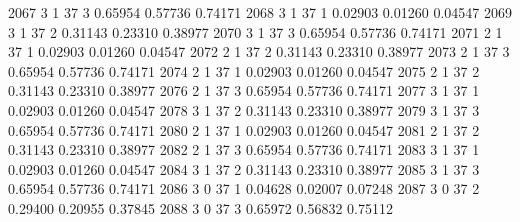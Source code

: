 \documentclass{article}
\begin{document}
\begin{Woutput}
2067      3       1      37       3       0.65954    0.57736    0.74171
2068      3       1      37       1       0.02903    0.01260    0.04547
2069      3       1      37       2       0.31143    0.23310    0.38977
2070      3       1      37       3       0.65954    0.57736    0.74171
2071      2       1      37       1       0.02903    0.01260    0.04547
2072      2       1      37       2       0.31143    0.23310    0.38977
2073      2       1      37       3       0.65954    0.57736    0.74171
2074      2       1      37       1       0.02903    0.01260    0.04547
2075      2       1      37       2       0.31143    0.23310    0.38977
2076      2       1      37       3       0.65954    0.57736    0.74171
2077      3       1      37       1       0.02903    0.01260    0.04547
2078      3       1      37       2       0.31143    0.23310    0.38977
2079      3       1      37       3       0.65954    0.57736    0.74171
2080      2       1      37       1       0.02903    0.01260    0.04547
2081      2       1      37       2       0.31143    0.23310    0.38977
2082      2       1      37       3       0.65954    0.57736    0.74171
2083      3       1      37       1       0.02903    0.01260    0.04547
2084      3       1      37       2       0.31143    0.23310    0.38977
2085      3       1      37       3       0.65954    0.57736    0.74171
2086      3       0      37       1       0.04628    0.02007    0.07248
2087      3       0      37       2       0.29400    0.20955    0.37845
2088      3       0      37       3       0.65972    0.56832    0.75112


\end{Woutput}
\end{document}
